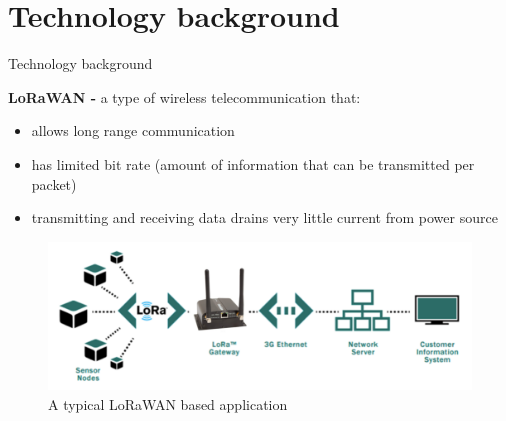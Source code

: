 \documentclass{beamer}
\begin{document}
\section{Technology background}

    \begin{frame}{Technology background}
        
        {\bf LoRaWAN -} a type of wireless telecommunication that:
        
        \begin{itemize}
            \item allows long range communication
            \item has limited bit rate (amount of information that can be transmitted per packet)
            \item transmitting and receiving data drains very little current from power source
        \end{itemize}
        \begin{center} 
            \begin{figure}
                \includegraphics[scale=0.5]{figures/lorawan.png}
                \caption{A typical LoRaWAN based application}
            \end{figure}
        \end{center}
        
    \end{frame}
    
\end{document}
